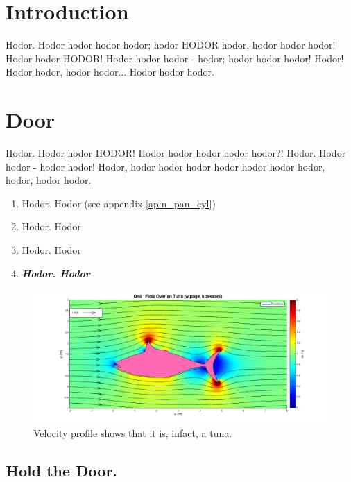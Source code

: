 \newpage

\section{Introduction}

Hodor. Hodor hodor hodor hodor; hodor HODOR hodor, hodor hodor hodor! Hodor hodor HODOR! Hodor hodor hodor - hodor; hodor hodor hodor! Hodor! Hodor hodor, hodor hodor... Hodor hodor hodor. 


\section{Door}

Hodor. Hodor hodor HODOR! Hodor hodor hodor hodor hodor?! Hodor. Hodor hodor - hodor hodor! Hodor, hodor hodor hodor hodor hodor hodor hodor, hodor, hodor hodor.



\begin{enumerate}
    \item Hodor. Hodor (see appendix \ref{ap:n_pan_cyl})
    \item Hodor. Hodor 
    \item Hodor. Hodor 
    \item \textbf{\textit{Hodor. Hodor }}
\end{enumerate}
%




\begin{figure}%
    \centering
    \includegraphics[width = \textwidth]{i/source_panels/qn4_itsnotatuna.png}
    \caption{Velocity profile shows that it is, infact, a tuna.}
    \label{fig:tuna_panels}
\end{figure}

%
\vspace{-2em}

\subsection{Hold the Door.}

